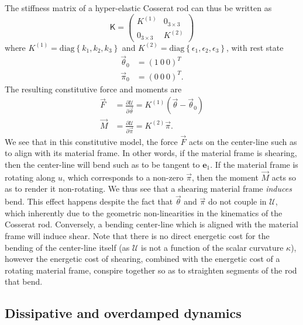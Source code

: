 The stiffness matrix of a hyper-elastic Cosserat rod can thus be written as
\begin{equation}
\mathsf{K} = \begin{pmatrix}
K^{(1)} & 0_{3 \times 3} \\
0_{3 \times 3} & K^{(2)}
\end{pmatrix}
\end{equation}
where $K^{(1)} = \text{diag} \left\{ k_1, k_2, k_3 \right\}$ and $K^{(2)} = \text{diag} \left\{ \epsilon_1, \epsilon_2, \epsilon_3 \right\}$, with rest state
\begin{subequations}
\begin{align}
\vec{\theta}_0 & = (1\ 0\ 0)^T \\
\vec{\pi}_0 & = (0\ 0\ 0)^T.
\end{align}
\end{subequations}
The resulting constitutive force and moments are
\begin{subequations}
\begin{align}
\vec{F} & = \frac{\partial \mathcal{U}}{\partial \vec{\theta}} = K^{(1)} (\vec{\theta} - \vec{\theta}_0) \\
\vec{M} & = \frac{\partial \mathcal{U}}{\partial \vec{\pi}} = K^{(2)} \vec{\pi}.
\end{align}
\end{subequations}
We see that in this constitutive model, the force $\vec{F}$ acts on the center-line such as to align with its material frame. In other words, if the material frame is shearing, then the center-line will bend such as to be tangent to $\mathbf{e}_1$. If the material frame is rotating along $u$, which corresponds to a non-zero $\vec{\pi}$, then the moment $\vec{M}$ acts so as to render it non-rotating.  We thus see that a shearing material frame \textit{induces} bend. This effect happens despite the fact that $\vec{\theta}$ and $\vec{\pi}$ do not couple in $\mathcal{U}$, which inherently due to the geometric non-linearities in the kinematics of the Cosserat rod. Conversely, a bending center-line which is aligned with the material frame will induce shear. Note that there is no direct energetic cost for the bending of the center-line itself (as $\mathcal{U}$ is not a function of the scalar curvature $\kappa$), however the energetic cost of shearing, combined with the energetic cost of a rotating material frame, conspire together so as to straighten segments of the rod that bend.

\subsection{Dissipative and overdamped dynamics} \label{sec:Dissipative and overdamped dynamics}

